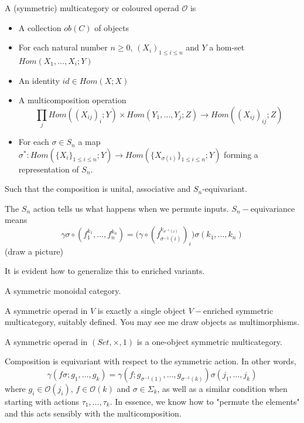 \begin{definition} A (symmetric) multicategory or coloured operad $\mathcal{O}$ is
    \begin{itemize}
        \item A collection $ob(C)$ of objects
        \item For each natural number $n\geq 0$, $(X_i)_{1\leq i \leq n}$ and $Y$ a hom-set $Hom(X_1,\dots,X_i;Y)$
        \item An identity $id\in Hom(X;X)$
        \item A multicomposition operation $$\prod_j Hom((X_{ij})_i;Y)\times Hom(Y_1,\dots, Y_j;Z)\rightarrow Hom((X_{ij})_{ij};Z)$$
        \item For each $\sigma\in S_n$ a map $\sigma^*:Hom(\{X_i\}_{1\leq i \leq n};Y)\rightarrow Hom(\{X_{\sigma(i)}\}_{1\leq i \leq n};Y)$ forming a representation of $S_n.$
    \end{itemize}
    Such that the composition is unital, associative and $S_n$-equivariant.
\end{definition}

    The $S_n$ action tells us what happens when we permute inputs.
 $S_n-$equivariance means $$\gamma\sigma\circ(f^{k_1}_1,\dots,f^{k_n}_n)=\big(\gamma\circ(f_{\sigma^{-1}(i)}^{k_{\sigma^{-1}(i)}})_i\big)\sigma(k_1,\dots,k_n)$$ (draw a picture)
    
    It is evident how to generalize this to enriched variants.



    \begin{example}
        A symmetric monoidal category.
    \end{example}
    
    \begin{definition}
    A symmetric operad in $V$ is exactly a single object $V-$enriched symmetric multicategory, suitably defined. You may see me draw objects as multimorphisms.
    \end{definition}




\begin{definition} A symmetric operad in $(Set,\times,1)$ is a one-object symmetric multicategory.
    \item Composition is equivariant with respect to the symmetric action. In other words, $$\gamma(f\sigma;g_1,\dots,g_k)=\gamma(f;g_{\sigma^{-1}(1)},\dots,g_{\sigma^{-1}(k)})\sigma(j_1,\dots,j_k)$$ where $g_i\in \mathcal{O}(j_i)$, $f\in \mathcal{O}(k)$ and $\sigma\in\Sigma_k$, as well as a similar condition when starting with actions $\tau_1,\dots,\tau_k$. In essence, we know how to "permute the elements" and this acts sensibly with the multicomposition.
\end{definition}



